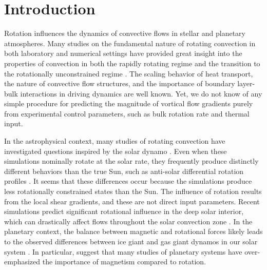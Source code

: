 \documentclass[twocolumn, amsmath, amsfonts, amssymb]{aastex62}
\begin{document}
\section{Introduction}
\label{sec:intro}
Rotation influences the dynamics of convective flows in
stellar and planetary atmospheres.
Many studies on the fundamental nature of
rotating convection in both laboratory and numerical settings
have provided great insight into the properties of convection 
in both the rapidly rotating regime 
\citep{julien&all2012, stellmach&all2014, gastine&all2016}
and the transition to the rotationally unconstrained regime \citep{king&all2009, zhong&all2009, 
cheng&all2015}. 
The scaling behavior of heat transport, the nature of convective flow
structures, and the importance of boundary layer-bulk interactions in driving dynamics are well known.
Yet, we do not know of any simple procedure for predicting the magnitude of vortical flow gradients 
purely from experimental control parameters, such as bulk rotation rate and thermal input.

In the astrophysical context,
many studies of rotating convection have investigated questions inspired by the solar dynamo
\citep{glatzmaier&gilman1982, busse2002, brown&all2008,
brown&all2010, brown&all2011, augustson&all2012, guerrero&all2013, kapyla&all2014}.
Even when these simulations nominally rotate at the solar rate,
they frequently produce distinctly different behaviors than the true Sun,
such as anti-solar differential rotation profiles  \citep{gastine&all2014}.
It seems that these differences occur because the simulations produce less rotationally 
constrained states than the Sun. 
The influence of rotation results from the local 
shear gradients, and these are not direct input parameters.
Recent simulations predict significant rotational influence in the deep solar interior, 
which can drastically affect flows throughout the solar convection zone 
\citep{featherstone&hindman2016, greer&all2016}. 
In the planetary context, the balance between magnetic
and rotational forces likely leads to the observed differences between ice
giant and gas giant dynamos in our solar system \citep{soderlund&all2015}.
In particular, \cite{aurnou&king2017} suggest that many studies of planetary systems
have over-emphasized the importance of magnetism compared to rotation.
\end{document}
